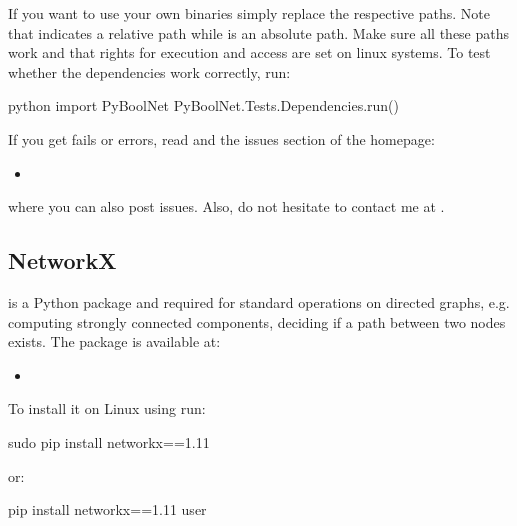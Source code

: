 \documentclass[letterpaper,10pt,english]{sphinxmanual}
\begin{document}
If you want to use your own binaries simply replace the respective paths. Note that  indicates a relative path while \sphinxcode{/} is an absolute path.
Make sure all these paths work and that rights for execution and access are set on linux systems.
To test whether the dependencies work correctly, run:

\begin{sphinxVerbatim}[commandchars=\\\{\}]
\PYGZdl{} python
\PYGZgt{}\PYGZgt{}\PYGZgt{} import PyBoolNet
\PYGZgt{}\PYGZgt{}\PYGZgt{} PyBoolNet.Tests.Dependencies.run()
\end{sphinxVerbatim}

If you get fails or errors, read {\hyperref[\detokenize{Installation:installation-troubleshooting}]{}} and the issues section of the homepage:
\begin{itemize}
\item {} 

\end{itemize}

where you can also post issues. Also, do not hesitate to contact me at .


\subsection{NetworkX}
\label{\detokenize{Installation:installation-networkx}}\label{\detokenize{Installation:networkx}}
 is a Python package and required for standard operations on directed graphs, e.g. computing strongly connected components,
deciding if a path between two nodes exists.
The package is available at:
\begin{itemize}
\item {} 

\end{itemize}

To install it on Linux using  run:

\begin{sphinxVerbatim}[commandchars=\\\{\}]
\PYGZdl{} sudo pip install networkx==1.11
\end{sphinxVerbatim}

or:

\begin{sphinxVerbatim}[commandchars=\\\{\}]
\PYGZdl{} pip install networkx==1.11 \PYGZhy{}\PYGZhy{}user
\end{sphinxVerbatim}
\end{document}
